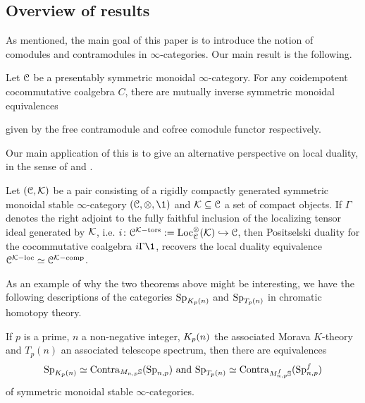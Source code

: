 \subsection*{Overview of results}

As mentioned, the main goal of this paper is to introduce the notion of comodules and contramodules in $\infty$-categories. Our main result is the following. 

\begin{introthm}
    \label{ch2:introthm:A}
    Let $\EuScript{C}$ be a presentably symmetric monoidal $\infty$-category. For any coidempotent cocommutative coalgebra $C$, there are mutually inverse symmetric monoidal equivalences
    \begin{center}
    \end{center}
    given by the free contramodule and cofree comodule functor respectively. 
\end{introthm}

Our main application of this is to give an alternative perspective on local duality, in the sense of \cite{hovey-palmiery-strickland_97} and \cite{barthel-heard-valenzuela_2018}. 

\begin{introthm}
    \label{ch2:introthm:B}
    Let $(\EuScript{C}, \mathcal{K})$ be a pair consisting of a rigidly compactly generated symmetric monoidal stable $\infty$-category $(\C, \otimes, \1)$ and $\mathcal{K}\subseteq \EuScript{C}$ a set of compact objects. If $\Gamma$ denotes the right adjoint to the fully faithful inclusion of the localizing tensor ideal generated by $\mathcal{K}$, i.e. $i\colon\EuScript{C}^{\mathcal{K}-\mathrm{tors}}:= \operatorname{Loc}_{\EuScript{C}}^\otimes (\mathcal{K})\hookrightarrow \EuScript{C}$, then Positselski duality for the cocommutative coalgebra $i\Gamma \1$, recovers the local duality equivalence $\EuScript{C}^{\mathcal{K}-\mathrm{loc}} \simeq \EuScript{C}^{\mathcal{K}-\mathrm{comp}}$. 
\end{introthm}

As an example of why the two theorems above might be interesting, we have the following descriptions of the categories $\mathrm{Sp}_{K_p(n)}$ and $\mathrm{Sp}_{T_p(n)}$ in chromatic homotopy theory. 

\begin{introcor}
    If $p$ is a prime, $n$ a non-negative integer, ${K_p(n)}$ the associated Morava $K$-theory and $T_p(n)$ an associated telescope spectrum, then there are equivalences 
    \[\mathrm{Sp}_{{K_p(n)}}\simeq \mathrm{Contra}_{M_{n,p}\mathbb{S}}(\mathrm{Sp}_{n,p}) \text{ and } \mathrm{Sp}_{T_p(n)}\simeq \mathrm{Contra}_{M_{n,p}^f \mathbb{S}}(\mathrm{Sp}_{n,p}^f)\]
    of symmetric monoidal stable $\infty$-categories. 
\end{introcor}



